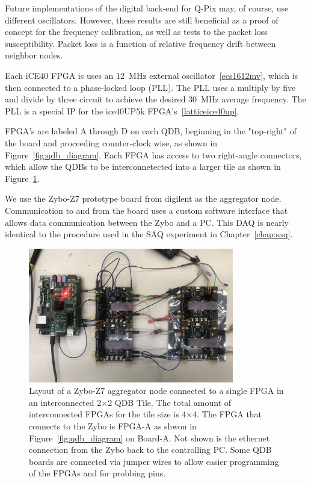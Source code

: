 Future implementations of the digital back-end for Q-Pix may, of course, use different oscillators.
However, these results are still beneficial as a proof of concept for the frequency calibration, as well as tests to the packet loss susceptibility.
Packet loss is a function of relative frequency drift between neighbor nodes.

Each iCE40 FPGA is uses an 12~\unit{MHz} external oscillator~\ref{ecs1612mv}, which is then connected to a phase-locked loop (PLL).
The PLL uses a multiply by five and divide by three circuit to achieve the desired 30~\unit{MHz} average frequency.
The PLL is a special IP for the ice40UP5k FPGA's~\ref{latticeice40up}.

FPGA's are labeled A through D on each QDB, beginning in the "top-right" of the board and proceeding counter-clock wise, as shown in Figure~\ref{fig:qdb_diagram}.
Each FPGA has access to two right-angle connectors, which allow the QDBs to be interconnetected into a larger tile as shown in Figure~\ref{fig:qdb_test_setup}.

We use the Zybo-Z7 prototype board from digilent as the aggregator node.
Communication to and from the board uses a custom software interface that allows data communication between the Zybo and a PC.
This DAQ is nearly identical to the procedure used in the SAQ experiment in Chapter~\ref{chap:saq}.

\begin{figure}[]
\centering
\includegraphics[width=0.8\textwidth]{./images/qdb_frequency_test_setup.jpg}
\caption{Layout of a Zybo-Z7 aggregator node connected to a single FPGA in an interconnected 2$\times$2 QDB Tile.
The total amount of interconnected FPGAs for the tile size is 4$\times$4.
The FPGA that connects to the Zybo is FPGA-A as shwon in Figure~\ref{fig:qdb_diagram} on Board-A.
Not shown is the ethernet connection from the Zybo back to the controlling PC.
Some QDB boards are connected via jumper wires to allow easier programming of the FPGAs and for probbing pins.
}
\label{fig:qdb_test_setup}
\end{figure}

